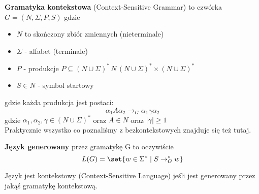 \begin{definition}
\textbf{Gramatyka kontekstowa} (Context-Sensitive Grammar) to czwórka \( G = (N, \Sigma, P, S) \) gdzie
\begin{itemize}
    \item \( N \) to skończony zbiór zmiennych (nieterminale)
    \item \( \Sigma \) - alfabet (terminale)
    \item \( P \) - produkcje \( P \subseteq  
    (N \cup \Sigma)^* \, N \, 
    (N \cup \Sigma)^* \times 
    (N \cup \Sigma)^* \)
    \item \( S \in N \) - symbol startowy
\end{itemize}
\end{definition}
gdzie każda produkcja jest postaci:
\[
    \alpha_1 A \alpha_2 \rightarrow_G \alpha_1 \gamma \alpha_2
\]
gdzie \( \alpha_1, \alpha_2, \gamma \in (N \cup \Sigma)^* \) oraz \( A \in N \)
oraz \( |\gamma| \geq 1\) \\
Praktycznie wszystko co poznaliśmy z bezkontekstowych znajduje się też tutaj.

\begin{definition}
    \textbf{Język  generowany} przez gramatykę G to oczywiście 
    \[
        L(G) = \set{w \in \Sigma^* \mid S \rightarrow_G^* w}
    \]
\end{definition}

\begin{definition}
    Język jest kontekstowy (Context-Sensitive Language) jeśli jest generowany przez jakąś gramatykę kontekstową.
\end{definition}
